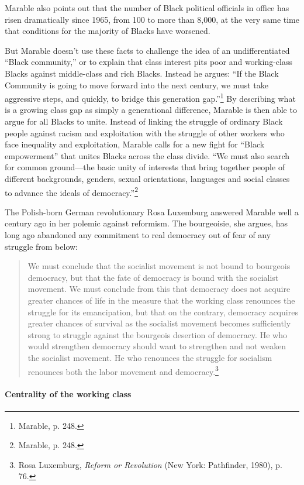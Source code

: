 Marable also points out that the number of Black political officials in office has risen dramatically since 1965, from 100 to more than 8,000, at the very same time that conditions for the majority of Blacks have worsened.

But Marable doesn't use these facts to challenge the idea of an undifferentiated ``Black community,'' or to explain that class interest pits poor and working-class Blacks against middle-class and rich Blacks. Instead he argues: ``If the Black Community is going to move forward into the next century, we must take aggressive steps, and quickly, to bridge this generation gap.''\footnote{Marable, p. 248.} By describing what is a growing class gap as simply a generational difference, Marable is then able to argue for all Blacks to unite. Instead of linking the struggle of ordinary Black people against racism and exploitation with the struggle of other workers who face inequality and exploitation, Marable calls for a new fight for ``Black empowerment'' that unites Blacks across the class divide. ``We must also search for common ground---the basic unity of interests that bring together people of different backgrounds, genders, sexual orientations, languages and social classes to advance the ideals of democracy.''\footnote{Marable, p. 248.}

The Polish-born German revolutionary Rosa Luxemburg answered Marable well a century ago in her polemic against reformism. The bourgeoisie, she argues, has long ago abandoned any commitment to real democracy out of fear of any struggle from below:

\blockquote{We must conclude that the socialist movement is not bound to bourgeois democracy, but that the fate of democracy is bound with the socialist movement. We must conclude from this that democracy does not acquire greater chances of life in the measure that the working class renounces the struggle for its emancipation, but that on the contrary, democracy acquires greater chances of survival as the socialist movement becomes sufficiently strong to struggle against the bourgeois desertion of democracy. He who would strengthen democracy should want to strengthen and not weaken the socialist movement. He who renounces the struggle for socialism renounces both the labor movement and democracy.\footnote{Rosa Luxemburg, \emph{Reform or Revolution} (New York: Pathfinder, 1980), p. 76.}}

\paragraph{Centrality of the working class}

